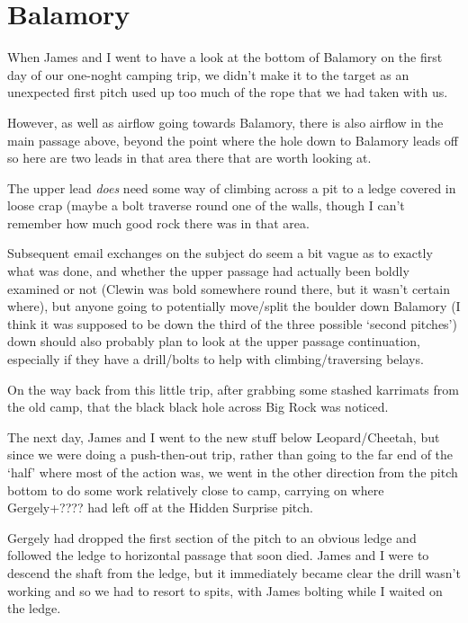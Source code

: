 
\hypertarget{balamory}{%
\section{Balamory}\label{balamory}}

When James and I went to have a look at the bottom of Balamory on the
first day of our one-noght camping trip, we didn't make it to the target
as an unexpected first pitch used up too much of the rope that we had
taken with us.

However, as well as airflow going towards Balamory, there is also
airflow in the main passage above, beyond the point where the hole down
to Balamory leads off so here are two leads in that area there that are
worth looking at.

The upper lead \emph{does} need some way of climbing across a pit to a
ledge covered in loose crap (maybe a bolt traverse round one of the
walls, though I can't remember how much good rock there was in that
area.

Subsequent email exchanges on the subject do seem a bit vague as to
exactly what was done, and whether the upper passage had actually been
boldly examined or not (Clewin was bold somewhere round there, but it
wasn't certain where), but anyone going to potentially move/split the
boulder down Balamory (I think it was supposed to be down the third of
the three possible `second pitches') down should also probably plan to
look at the upper passage continuation, especially if they have a
drill/bolts to help with climbing/traversing belays.

On the way back from this little trip, after grabbing some stashed
karrimats from the old camp, that the black black hole across Big Rock
was noticed.

The next day, James and I went to the new stuff below Leopard/Cheetah,
but since we were doing a push-then-out trip, rather than going to the
far end of the `half' where most of the action was, we went in the other
direction from the pitch bottom to do some work relatively close to
camp, carrying on where Gergely+???? had left off at the Hidden Surprise
pitch.

Gergely had dropped the first section of the pitch to an obvious ledge
and followed the ledge to horizontal passage that soon died. James and I
were to descend the shaft from the ledge, but it immediately became
clear the drill wasn't working and so we had to resort to spits, with
James bolting while I waited on the ledge.

